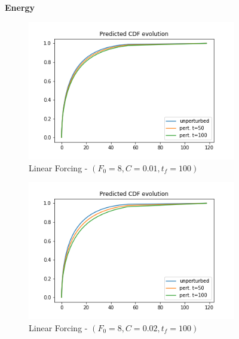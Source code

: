 \documentclass{article}
\begin{document}
\begin{figure}[!ht]
	\centering
	\textbf{Energy}\par\medskip
	\begin{subfigure}[b]{0.48\textwidth}
		\includegraphics[width=1\linewidth]{fig/pred_cdf_energy_below_L_001_100.png}
		\caption{Linear Forcing - $(F_0=8, C=0.01, t_f=100)$}
		\label{fig:pred_cdf_energy_bin_00q_10q_LF_8_001_0_100}
	\end{subfigure}%
	\begin{subfigure}[b]{0.48\textwidth}
		\includegraphics[width=1\linewidth]{fig/pred_cdf_energy_below_L_002_100.png}
		\caption{Linear Forcing - $(F_0=8, C=0.02, t_f=100)$}
		\label{fig:pred_cdf_energy_bin_00q_10q_LF_8_002_0_100}
	\end{subfigure}
	\begin{subfigure}[b]{0.48\textwidth}

\end{subfigure}
\end{figure}
\end{document}
